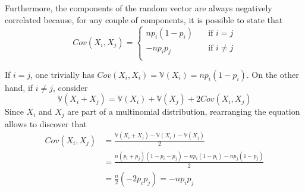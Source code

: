 \documentclass{report}
\begin{document}
\noindent Furthermore, the components of the random vector are always negatively correlated because, for any couple of components, it is possible to state that
\[Cov(X_i, X_j) = \begin{cases}
    np_i(1 - p_i) &\quad\text{if $i = j$} \\
    -np_ip_j &\quad\text{if $i \neq j$} \\
\end{cases}\]
\begin{proofbox}
    If $\displaystyle i = j$, one trivially has $\displaystyle Cov(X_i, X_i) = \mathbb{V}(X_i) = np_i(1 - p_i)$. \newline
    On the other hand, if $\displaystyle i \neq j$, consider
    \[\mathbb{V}(X_i + X_j) = \mathbb{V}(X_i) + \mathbb{V}(X_j) + 2Cov(X_i, X_j)\]
    Since $\displaystyle X_i$ and $\displaystyle X_j$ are part of a multinomial distribution, rearranging the equation allows to discover that
    \begin{align*}
        Cov(X_i, X_j)
            &= \frac{\mathbb{V}(X_i + X_j) - \mathbb{V}(X_i) - \mathbb{V}(X_j)}{2} \\
            &= \frac{n(p_i + p_j)(1 - p_i - p_j) - np_i(1 - p_i) - np_j(1 - p_j)}{2} \\
            &= \frac{n}{2}(-2p_ip_j) = -np_ip_j
    \end{align*}
\end{proofbox}
\end{document}
